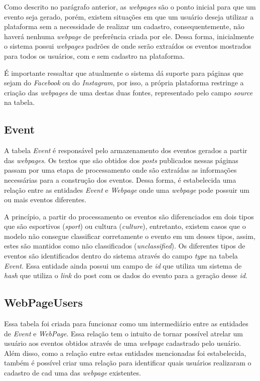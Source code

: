 Como descrito no parágrafo anterior, as \textit{webpages} são o ponto inicial
para que um evento seja gerado, porém, existem situações em que um usuário
deseja utilizar a plataforma sem a necessidade de realizar um cadastro,
consequentemente, não haverá nenhuma \textit{webpage} de preferência criada por
ele. Dessa forma, inicialmente o sistema possui \textit{webpages} padrões de
onde serão extraídos os eventos mostrados para todos os usuários, com e sem
cadastro na plataforma.

É importante ressaltar que atualmente o sistema dá suporte para páginas que sejam do \textit{Facebook} ou do \textit{Instagram}, por isso, a própria plataforma restringe a criação das \textit{webpages} de uma destas duas fontes, representado pelo campo \textit{source} na tabela.

\subsection{Event}

A tabela \textit{Event} é responsável pelo armazenamento dos eventos gerados a
partir das \textit{webpages}. Os textos que são obtidos dos \textit{posts}
publicados nessas páginas passam por uma etapa de processamento onde são
extraídas as informações necessárias para a construção dos eventos. Dessa
forma, é estabelecida uma relação entre as entidades \textit{Event} e
\textit{Webpage} onde uma \textit{webpage} pode possuir um ou mais eventos
diferentes.

A princípio, a partir do processamento os eventos são diferenciados em dois
tipos que são esportivos (\textit{sport}) ou cultura (\textit{culture}),
entretanto, existem casos que o modelo não consegue classificar corretamente o
evento em um desses tipos, assim, estes são mantidos como não classificados
(\textit{unclassified}). Os diferentes tipos de eventos são identificados
dentro do sistema através do campo \textit{type} na tabela \textit{Event}. Essa
entidade ainda possui um campo de \textit{id} que utiliza um sistema de
\textit{hash} que utiliza o \textit{link} do post com os dados do evento para a
geração desse \textit{id}.

\subsection{WebPageUsers}
\label{sec:WebPageUsers}

Essa tabela foi criada para funcionar como um intermediário entre as entidades
de \textit{Event} e \textit{WebPage}. Essa relação tem o intuito de tornar
possível atrelar um usuário aos eventos obtidos através de uma \textit{webpage}
cadastrado pelo usuário. Além disso, como a relação entre estas entidades
mencionadas foi estabelecida, também é possível criar uma relação para
identificar quais usuários realizaram o cadastro de cad uma das
\textit{webpage} existentes.
